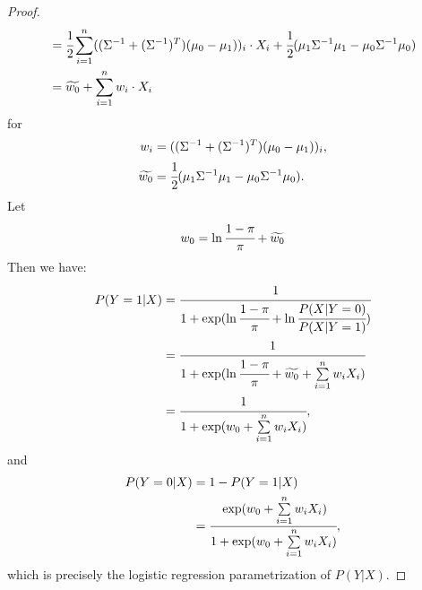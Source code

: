 \documentclass[12pt]{article}
\newcommand\inv[1]{#1^{-1}}
\begin{document}
\begin{proof}
\begin{align*}
    &= \cfrac{1}{2}\sum\limits_{i=1}^n((\Sigma^{-1} + (\Sigma^{-1})^T)(\mu_0 - \mu_1))_i\cdot X_i + \cfrac{1}{2}(\mu_{1}\inv{\Sigma}\mu_{1} - \mu_{0}\inv{\Sigma}\mu_{0}) \\
    &= \widetilde{w_0} + \sum\limits_{i=1}^n w_i\cdot X_i
  \end{align*}
  for
  \begin{align*}
    w_i &= ((\Sigma^{-1} + (\Sigma^{-1})^T)(\mu_0 - \mu_1))_i, \\
   \widetilde{w_0} &= \cfrac{1}{2}(\mu_{1}\inv{\Sigma}\mu_{1} - \mu_{0}\inv{\Sigma}\mu_{0}).
  \end{align*}
  Let
  \begin{align*}
    w_0 = \ln\cfrac{1-\pi}{\pi} + \widetilde{w_0}
  \end{align*}
  Then we have:
  \begin{align*}
    P(Y=1|X)
    &= \cfrac{1}{1+\exp(\ln\cfrac{1-\pi}{\pi} + \ln\cfrac{P(X|Y=0)}{P(X|Y=1)})} \\
    &= \cfrac{1}{1+\exp(\ln\cfrac{1-\pi}{\pi} + \widetilde{w_0} + \sum\limits_{i=1}^nw_iX_i)} \\
    &= \cfrac{1}{1+\exp(w_0 + \sum\limits_{i=1}^nw_iX_i)},
  \end{align*}
  and
  \begin{align*}
    P(Y=0|X) &= 1 - P(Y=1|X) \\
    &= \cfrac{\exp(w_0 + \sum\limits_{i=1}^nw_iX_i)}{1+\exp(w_0 + \sum\limits_{i=1}^nw_iX_i)},
  \end{align*}
  which is precisely the logistic regression parametrization of $P(Y|X)$.
\end{proof}
\end{document}
